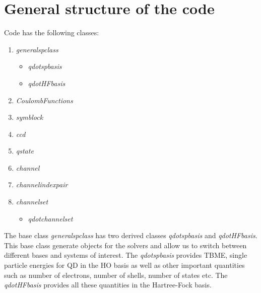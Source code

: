 \documentclass[twoside,english]{uiofysmaster}
\theoremstyle{definition}
\begin{document}
\section{General structure of the code}\label{sec:impl1}
Code has the following classes:
\begin{enumerate}
\item  \textit{generalspclass} 
	\begin{itemize}
	\item \textit{qdotspbasis}
	\item \textit{qdotHFbasis}
	\end{itemize}
\item \textit{CoulombFunctions}	
\item \textit{symblock}
\item \textit{ccd}
\item \textit{qstate}
\item \textit{channel}
\item \textit{channelindexpair}
\item \textit{channelset}
\begin{itemize}
	\item \textit{qdotchannelset}
\end{itemize}
\end{enumerate}
The base class \textit{generalspclass} has two derived classes \textit{qdotspbasis} and \textit{qdotHFbasis}. This base class generate objects for the solvers and allow us to switch between different bases and systems of interest. The \textit{qdotspbasis} provides TBME, single particle energies for QD in the HO basis as well as other important quantities such as number of electrons, number of shells, number of states etc. The \textit{qdotHFbasis} provides all these quantities in the Hartree-Fock basis.
\end{document}

